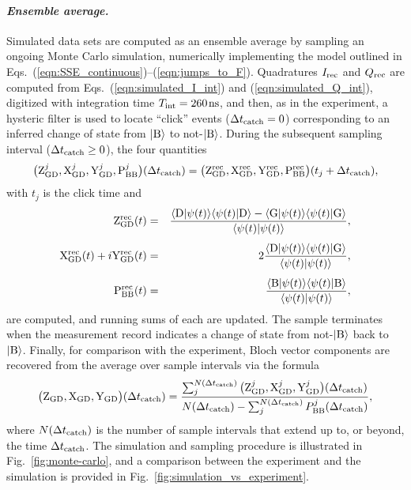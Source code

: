 \paragraph{\textit{\emph{Ensemble average.}}\emph{ }}

Simulated data sets are computed as an ensemble average by sampling
an ongoing Monte Carlo simulation, numerically implementing the model
outlined in Eqs.~(\ref{eqn:SSE_continuous})--(\ref{eqn:jumps_to_F}).
Quadratures $I_{{\rm rec}}$ and $Q_{{\rm rec}}$ are computed from
Eqs.~(\ref{eqn:simulated_I_int}) and (\ref{eqn:simulated_Q_int}),
digitized with integration time $T_{{\rm int}}=260\mkern2mu {\rm ns}$,
and then, as in the experiment, a hysteric filter is used to locate
``click'' events ($\Delta t_{{\rm catch}}=0$) corresponding to
an inferred change of state from $|{\rm B}\rangle$ to not-$|{\rm B}\rangle$.
During the subsequent sampling interval ($\Delta t_{{\rm catch}}\geq0$),
the four quantities 
\begin{equation}
\big({\rm Z}_{{\rm GD}}^{j},{\rm X}_{{\rm GD}}^{j},{\rm Y}_{{\rm GD}}^{j},{\rm P}_{{\rm BB}}^{j}\big)(\Delta t_{{\rm catch}})=\big({\rm Z}_{{\rm GD}}^{{\rm rec}},{\rm X}_{{\rm GD}}^{{\rm rec}},{\rm Y}_{{\rm GD}}^{{\rm rec}},{\rm P}_{{\rm BB}}^{{\rm rec}}\big)(t_{j}+\Delta t_{{\rm catch}}),
\end{equation}
with $t_{j}$ is the click time and 
\begin{eqnarray}
{\rm Z}_{{\rm GD}}^{{\rm rec}}(t) & = & \frac{\langle{\rm D}|\psi(t)\rangle\langle\psi(t)|{\rm D}\rangle-\langle{\rm G}|\psi(t)\rangle\langle\psi(t)|{\rm G}\rangle}{\langle\psi(t)|\psi(t)\rangle},\label{eqn:correlated_Z_GD}\\
\noalign{\vskip4pt}{\rm X}_{{\rm GD}}^{{\rm rec}}(t)+i{\rm Y}_{{\rm GD}}^{{\rm rec}}(t) & = & 2\frac{\langle{\rm D}|\psi(t)\rangle\langle\psi(t)|{\rm G}\rangle}{\langle\psi(t)|\psi(t)\rangle},\label{eqn:correlated_X_GD=000026Y_GD}\\
\noalign{\vskip4pt}{\rm P}_{{\rm BB}}^{{\rm rec}}(t) & = & \frac{\langle{\rm B}|\psi(t)\rangle\langle\psi(t)|{\rm B}\rangle}{\langle\psi(t)|\psi(t)\rangle},
\end{eqnarray}
are computed, and running sums of each are updated. The sample terminates
when the measurement record indicates a change of state from not-$|{\rm B}\rangle$
back to $|{\rm B}\rangle$. Finally, for comparison with the experiment,
Bloch vector components are recovered from the average over sample
intervals via the formula 
\begin{equation}
\big({\rm Z}_{{\rm GD}},{\rm X}_{{\rm GD}},{\rm Y}_{{\rm GD}}\big)(\Delta t_{{\rm catch}})=\frac{\sum_{j}^{N(\Delta t_{{\rm catch}})}\big({\rm Z}_{{\rm GD}}^{j},{\rm X}_{{\rm GD}}^{j},{\rm Y}_{{\rm GD}}^{j}\big)(\Delta t_{{\rm catch}})}{N(\Delta t_{{\rm catch}})-\sum_{j}^{N(\Delta t_{{\rm catch}})}P_{{\rm BB}}^{j}(\Delta t_{{\rm catch}})},\label{eqn:ensemble_average}
\end{equation}
where $N(\Delta t_{{\rm catch}})$ is the number of sample intervals
that extend up to, or beyond, the time $\Delta t_{{\rm catch}}$.
The simulation and sampling procedure is illustrated in Fig.~\ref{fig:monte-carlo},
and a comparison between the experiment and the simulation is provided
in Fig.~\ref{fig:simulation_vs_experiment}.

